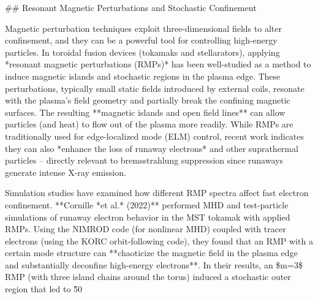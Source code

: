 \documentclass[12pt]{article}
\begin{document}
{## Resonant Magnetic Perturbations and Stochastic Confinement

Magnetic perturbation techniques exploit three-dimensional fields to alter confinement, and they can be a powerful tool for controlling high-energy particles. In toroidal fusion devices (tokamaks and stellarators), applying *resonant magnetic perturbations (RMPs)* has been well-studied as a method to induce magnetic islands and stochastic regions in the plasma edge. These perturbations, typically small static fields introduced by external coils, resonate with the plasma’s field geometry and partially break the confining magnetic surfaces. The resulting **magnetic islands and open field lines** can allow particles (and heat) to flow out of the plasma more readily. While RMPs are traditionally used for edge-localized mode (ELM) control, recent work indicates they can also *enhance the loss of runaway electrons* and other suprathermal particles – directly relevant to bremsstrahlung suppression since runaways generate intense X-ray emission.

Simulation studies have examined how different RMP spectra affect fast electron confinement. **Cornille *et al.* (2022)** performed MHD and test-particle simulations of runaway electron behavior in the MST tokamak with applied RMPs. Using the NIMROD code (for nonlinear MHD) coupled with tracer electrons (using the KORC orbit-following code), they found that an RMP with a certain mode structure can **chaoticize the magnetic field in the plasma edge and substantially deconfine high-energy electrons**. In their results, an \$m=3\$ RMP (with three island chains around the torus) induced a stochastic outer region that led to \~50%

}
\end{document}
